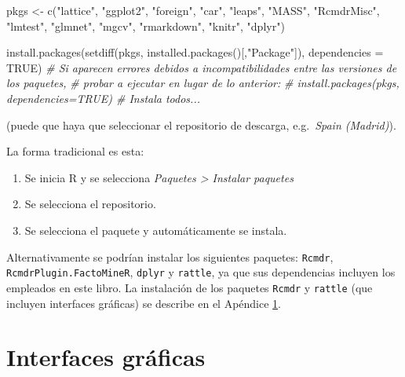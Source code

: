 \documentclass[
]{book}
\newenvironment{Shaded}{\begin{snugshade}}{\end{snugshade}}
\newcommand{\AttributeTok}[1]{\textcolor[rgb]{0.77,0.63,0.00}{#1}}
\newcommand{\CommentTok}[1]{\textcolor[rgb]{0.56,0.35,0.01}{\textit{#1}}}
\newcommand{\ConstantTok}[1]{\textcolor[rgb]{0.00,0.00,0.00}{#1}}
\newcommand{\FunctionTok}[1]{\textcolor[rgb]{0.00,0.00,0.00}{#1}}
\newcommand{\NormalTok}[1]{#1}
\newcommand{\OtherTok}[1]{\textcolor[rgb]{0.56,0.35,0.01}{#1}}
\newcommand{\StringTok}[1]{\textcolor[rgb]{0.31,0.60,0.02}{#1}}
\theoremstyle{break}
\begin{document}
\begin{Shaded}
\begin{Highlighting}[]
\NormalTok{pkgs }\OtherTok{\textless{}{-}} \FunctionTok{c}\NormalTok{(}\StringTok{"lattice"}\NormalTok{, }\StringTok{"ggplot2"}\NormalTok{, }\StringTok{"foreign"}\NormalTok{, }\StringTok{"car"}\NormalTok{, }\StringTok{"leaps"}\NormalTok{, }\StringTok{"MASS"}\NormalTok{, }\StringTok{"RcmdrMisc"}\NormalTok{, }
          \StringTok{"lmtest"}\NormalTok{, }\StringTok{"glmnet"}\NormalTok{, }\StringTok{"mgcv"}\NormalTok{, }\StringTok{"rmarkdown"}\NormalTok{, }\StringTok{"knitr"}\NormalTok{, }\StringTok{"dplyr"}\NormalTok{)}

\FunctionTok{install.packages}\NormalTok{(}\FunctionTok{setdiff}\NormalTok{(pkgs, }\FunctionTok{installed.packages}\NormalTok{()[,}\StringTok{"Package"}\NormalTok{]), }\AttributeTok{dependencies =} \ConstantTok{TRUE}\NormalTok{)}
\CommentTok{\# Si aparecen errores debidos a incompatibilidades entre las versiones de los paquetes, }
\CommentTok{\# probar a ejecutar en lugar de lo anterior:}
\CommentTok{\# install.packages(pkgs, dependencies=TRUE) \# Instala todos...}
\end{Highlighting}
\end{Shaded}

(puede que haya que seleccionar el repositorio de descarga, e.g.~\emph{Spain
(Madrid)}).

La forma tradicional es esta:

\begin{enumerate}
\def\labelenumi{\arabic{enumi}.}
\item
  Se inicia R y se selecciona \emph{Paquetes \textgreater{} Instalar paquetes}
\item
  Se selecciona el repositorio.
\item
  Se selecciona el paquete y automáticamente se instala.
\end{enumerate}

Alternativamente se podrían instalar los siguientes paquetes: \texttt{Rcmdr},
\texttt{RcmdrPlugin.FactoMineR}, \texttt{dplyr} y \texttt{rattle}, ya que sus dependencias
incluyen los empleados en este libro.
La instalación de los paquetes \texttt{Rcmdr} y \texttt{rattle} (que incluyen interfaces gráficas) se describe
en el Apéndice \ref{interfaces}.

\hypertarget{interfaces}{%
\chapter{Interfaces gráficas}\label{interfaces}}
\end{document}
